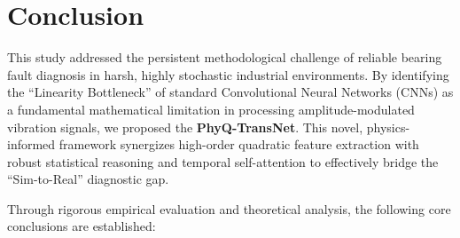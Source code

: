 \documentclass[5p,times,twocolumn]{elsarticle}
\begin{document}
\section{Conclusion}
\label{sec:conclusion}

This study addressed the persistent methodological challenge of reliable bearing fault diagnosis in harsh, highly stochastic industrial environments. By identifying the ``Linearity Bottleneck'' of standard Convolutional Neural Networks (CNNs) as a fundamental mathematical limitation in processing amplitude-modulated vibration signals, we proposed the \textbf{PhyQ-TransNet}. This novel, physics-informed framework synergizes high-order quadratic feature extraction with robust statistical reasoning and temporal self-attention to effectively bridge the ``Sim-to-Real'' diagnostic gap.

Through rigorous empirical evaluation and theoretical analysis, the following core conclusions are established:
\end{document}
